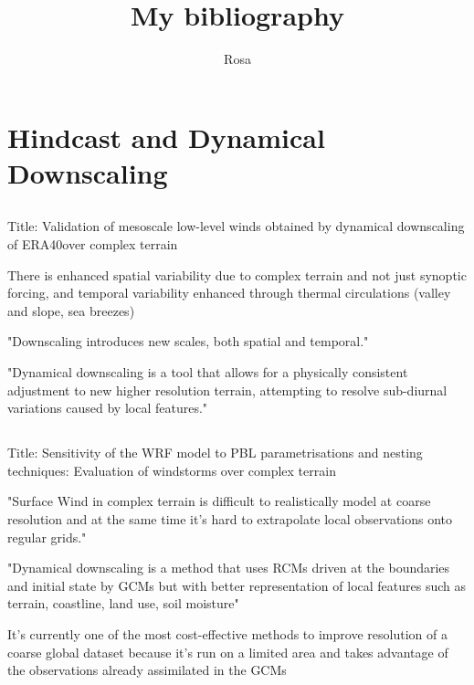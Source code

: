 \documentclass[12pt,a4paper]{article}
\title{My bibliography}
\author{Rosa}
\begin{document}
\maketitle
\tableofcontents

\section{Hindcast and Dynamical Downscaling }

\subsection{\cite{Zagar2006}}

Title: Validation of mesoscale low-level winds obtained by dynamical downscaling of ERA40over complex terrain
 
There is enhanced spatial variability due to complex terrain and not just synoptic forcing, and temporal variability enhanced through thermal circulations (valley and slope, sea breezes) 

"Downscaling introduces new scales, both spatial and temporal."

"Dynamical downscaling is a tool that allows for a physically consistent adjustment to new higher resolution terrain, attempting to resolve sub-diurnal variations caused by local features."

\subsection{\cite{Gomez-Navarro2015}}

Title:  Sensitivity of the WRF model to PBL parametrisations and nesting techniques: Evaluation of windstorms over complex terrain

"Surface Wind in complex terrain is difficult to realistically model at coarse resolution and at the same time it's hard to extrapolate local observations onto regular grids."

"Dynamical downscaling is a method that uses RCMs driven at the boundaries and initial state by GCMs but with better representation of local features such as terrain, coastline, land use, soil moisture"

It's currently one of the most cost-effective methods to improve resolution of a coarse global dataset because it's run on a limited area and takes advantage of the observations already assimilated in the GCMs

\subsection{\cite{Castro2005}}
\end{document}
